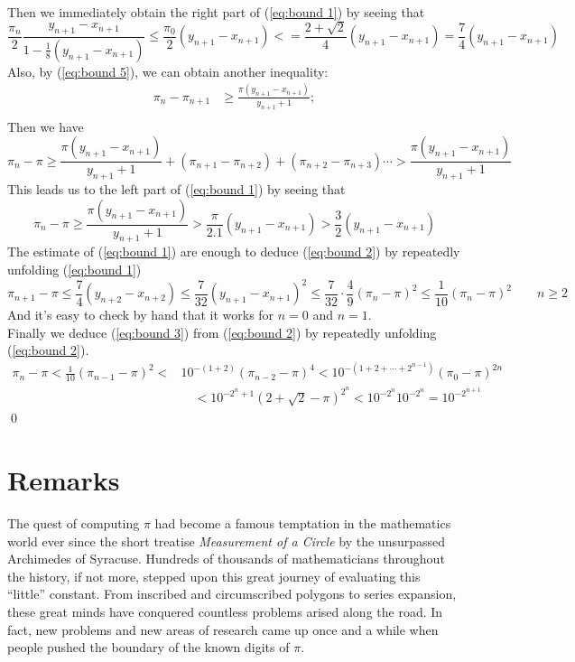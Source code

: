 \documentclass{report}
\begin{document}
\begin{titlepage}
\begin{align*}
\end{align*}
Then we immediately obtain the right part of (\ref {eq:bound 1}) by seeing that{\rm\cite{Borwein:1987aa}}
\[
\frac{\pi_n}{2}\frac{y_{n+1}-x_{n+1}}{1-\frac{1}{8}(y_{n+1}-x_{n+1})}\leq\frac{\pi_0}{2}(y_{n+1}-x_{n+1})<=\frac{2+\sqrt2}{4}(y_{n+1}-x_{n+1})=\frac{7}{4}(y_{n+1}-x_{n+1})
\]
Also, by (\ref {eq:bound 5}), we can obtain another inequality:
\begin{align*}
\pi_{n}-\pi_{n+1}&\ge\frac{\pi(y_{n+1}-x_{n+1})}{y_{n+1}+1};\\
\end{align*}
Then we have
\[
\pi_{n}-\pi\ge\frac{\pi(y_{n+1}-x_{n+1})}{y_{n+1}+1}+(\pi_{n+1}-\pi_{n+2})+(\pi_{n+2}-\pi_{n+3})\cdots>\frac{\pi(y_{n+1}-x_{n+1})}{y_{n+1}+1}
\]
This leads us to the left part of (\ref{eq:bound 1})  by seeing that\cite{Borwein:1987aa}
\[
\pi_{n}-\pi\ge\frac{\pi(y_{n+1}-x_{n+1})}{y_{n+1}+1}>\frac{\pi}{2.1}(y_{n+1}-x_{n+1})>\frac{3}{2}(y_{n+1}-x_{n+1})
\]
The estimate of (\ref{eq:bound 1}) are enough to deduce (\ref{eq:bound 2}) by repeatedly unfolding  (\ref{eq:bound 1})\cite{Borwein:1987aa}
\[
\pi_{n+1}-\pi\le\frac{7}{4}(y_{n+2}-x_{n+2})\leq\frac{7}{32}(y_{n+1}-x_{n+1})^2\leq\frac{7}{32}\cdot\frac{4}{9}(\pi_n-\pi)^2\leq\frac{1}{10}(\pi_n-\pi)^2\qquad n\ge2
\]
And it's easy to check by hand that it works for $n=0$ and $n=1$.\\
Finally we deduce (\ref{eq:bound 3}) from (\ref{eq:bound 2}) by repeatedly unfolding (\ref{eq:bound 2}){\rm\cite{Borwein:1987aa}}. 
\begin{align*}
\pi_{n}-\pi<\frac{1}{10}(\pi_{n-1}-\pi)^2<&10^{-(1+2)}(\pi_{n-2}-\pi)^4<10^{-(1+2+\cdots+2^{n-1})}(\pi_{0}-\pi)^{2n}\\
&\quad<10^{-2^{n}+1}(2+\sqrt2-\pi)^{2^n}<10^{-2^{n}}10^{-2^n}
=10^{-2^{n+1}}
\end{align*}
\qed


\section{Remarks\hfill}
 The quest of computing $\pi$ had become a famous temptation in the mathematics world ever since the short treatise {\it Measurement of a Circle} by the unsurpassed Archimedes of Syracuse\cite{Dunham:1990aa}. Hundreds of thousands of mathematicians throughout the history, if not more, stepped upon this great journey of evaluating this ``little'' constant. From inscribed and circumscribed polygons to series expansion, these great minds have conquered countless problems arised along the road. In fact, new problems and new areas of research came up once and a while when people pushed the boundary of the known digits of $\pi$. 


\end{titlepage}
\end{document}
